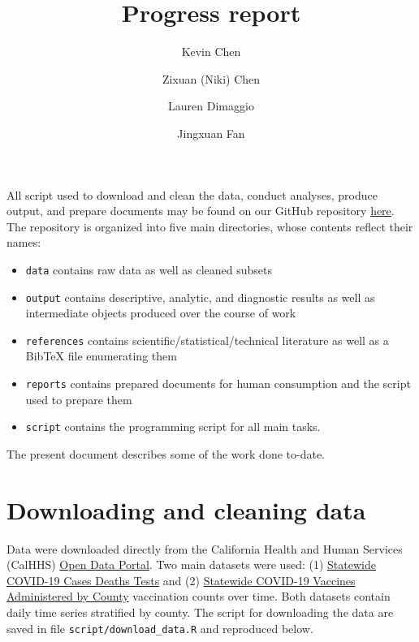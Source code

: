 \documentclass[
  11pt,
  letterpaper,
  DIV=11,
  numbers=noendperiod]{scrartcl}
\title{Progress report}
\author{Kevin Chen \and Zixuan (Niki) Chen \and Lauren
Dimaggio \and Jingxuan Fan}
\date{}
\providecommand{\tightlist}{%
  \setlength{\itemsep}{0pt}\setlength{\parskip}{0pt}}\usepackage{longtable,booktabs,array}
\begin{document}
\maketitle
\ifdefined\Shaded\renewenvironment{Shaded}{\begin{tcolorbox}[interior hidden, frame hidden, breakable, borderline west={3pt}{0pt}{shadecolor}, boxrule=0pt, sharp corners, enhanced]}{\end{tcolorbox}}\fi

All script used to download and clean the data, conduct analyses,
produce output, and prepare documents may be found on our GitHub
repository
\href{https://github.berkeley.edu/kevchen/capstone-epi}{here}. The
repository is organized into five main directories, whose contents
reflect their names:

\begin{itemize}
\tightlist
\item
  \texttt{data} contains raw data as well as cleaned subsets
\item
  \texttt{output} contains descriptive, analytic, and diagnostic results
  as well as intermediate objects produced over the course of work
\item
  \texttt{references} contains scientific/statistical/technical
  literature as well as a BibTeX file enumerating them
\item
  \texttt{reports} contains prepared documents for human consumption and
  the script used to prepare them
\item
  \texttt{script} contains the programming script for all main tasks.
\end{itemize}

The present document describes some of the work done to-date.

\hypertarget{downloading-and-cleaning-data}{%
\section{Downloading and cleaning
data}\label{downloading-and-cleaning-data}}

Data were downloaded directly from the California Health and Human
Services (CalHHS) \href{https://data.chhs.ca.gov}{Open Data Portal}. Two
main datasets were used: (1)
\href{https://data.chhs.ca.gov/dataset/covid-19-time-series-metrics-by-county-and-state}{Statewide
COVID-19 Cases Deaths Tests} and (2)
\href{https://data.chhs.ca.gov/dataset/vaccine-progress-dashboard}{Statewide
COVID-19 Vaccines Administered by County} vaccination counts over time.
Both datasets contain daily time series stratified by county. The script
for downloading the data are saved in file
\texttt{script/download\_data.R} and reproduced below.
\end{document}
